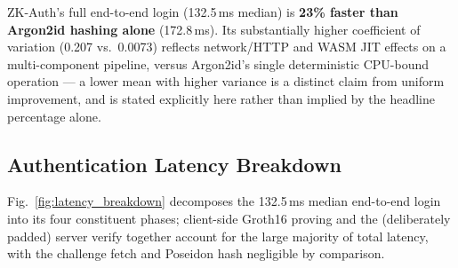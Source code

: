 \documentclass[journal,twoside,10pt]{IEEEtran}
\begin{document}
\begin{table}[!t]
\renewcommand{\arraystretch}{1.2}
\caption{Direct Mean Comparison: ZK-Auth vs.\ Argon2id.}
\label{tab:mean_comparison}
\centering
{}
\end{table}

ZK-Auth's full end-to-end login (132.5\,ms median) is \textbf{23\% faster
than Argon2id hashing alone} (172.8\,ms). Its substantially higher
coefficient of variation (0.207 vs.\ 0.0073) reflects network/HTTP and WASM
JIT effects on a multi-component pipeline, versus Argon2id's single
deterministic CPU-bound operation --- a lower mean with higher variance is
a distinct claim from uniform improvement, and is stated explicitly here
rather than implied by the headline percentage alone.

\subsection{Authentication Latency Breakdown}
Fig.~\ref{fig:latency_breakdown} decomposes the 132.5\,ms median end-to-end
login into its four constituent phases; client-side Groth16 proving and the
(deliberately padded) server verify together account for the large majority
of total latency, with the challenge fetch and Poseidon hash negligible by
comparison.
\end{document}
